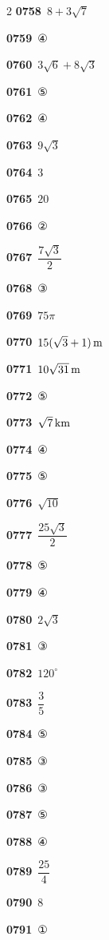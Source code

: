 \documentclass[10pt,a4paper]{article}
\begin{document}
\begin{multicols}{2}
\noindent\textbf{0758}\ $8+3\sqrt{7}$\par
\noindent\textbf{0759}\ ④\par
\noindent\textbf{0760}\ $3\sqrt{6}+8\sqrt{3}$\par
\noindent\textbf{0761}\ ⑤\par
\noindent\textbf{0762}\ ④\par
\noindent\textbf{0763}\ $9\sqrt{3}$\par
\noindent\textbf{0764}\ $3$\par
\noindent\textbf{0765}\ $20$\par
\noindent\textbf{0766}\ ②\par
\noindent\textbf{0767}\ $\dfrac{7\sqrt{3}}{2}$\par
\noindent\textbf{0768}\ ③\par
\noindent\textbf{0769}\ $75\pi$\par
\noindent\textbf{0770}\ $15(\sqrt{3}+1)\mkern3mu \mathrm{m}$\par
\noindent\textbf{0771}\ $10\sqrt{31}\mkern3mu \mathrm{m}$\par
\noindent\textbf{0772}\ ⑤\par
\noindent\textbf{0773}\ $\sqrt{7}\mkern3mu \mathrm{km}$\par
\noindent\textbf{0774}\ ④\par
\noindent\textbf{0775}\ ⑤\par
\noindent\textbf{0776}\ $\sqrt{10}$\par
\noindent\textbf{0777}\ $\dfrac{25\sqrt{3}}{2}$\par
\noindent\textbf{0778}\ ⑤\par
\noindent\textbf{0779}\ ④\par
\noindent\textbf{0780}\ $2\sqrt{3}$\par
\noindent\textbf{0781}\ ③\par
\noindent\textbf{0782}\ $120^\circ$\par
\noindent\textbf{0783}\ $\dfrac{3}{5}$\par
\noindent\textbf{0784}\ ⑤\par
\noindent\textbf{0785}\ ③\par
\noindent\textbf{0786}\ ③\par
\noindent\textbf{0787}\ ⑤\par
\noindent\textbf{0788}\ ④\par
\noindent\textbf{0789}\ $\dfrac{25}{4}$\par
\noindent\textbf{0790}\ $8$\par
\noindent\textbf{0791}\ ①\par

\end{multicols}
\end{document}
